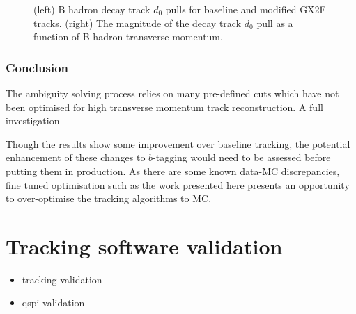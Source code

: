 \begin{figure}[!htbp]
\begin{subfigure}{.5\textwidth}
    \end{subfigure}
    \caption{(left) B hadron decay track $d_0$ pulls for baseline and modified GX2F tracks. (right) The magnitude of the decay track $d_0$ pull as a function of B hadron transverse momentum.}
    \label{fig:gx2f_opt_pulls}
\end{figure}




\subsubsection{Conclusion}

The ambiguity solving process relies on many pre-defined cuts which have not been optimised for high transverse momentum \bhadron track reconstruction.
A full investigation 


Though the results show some improvement over baseline tracking, the potential enhancement of these changes to $b$-tagging would need to be assessed before putting them in production. As there are some known data-MC discrepancies, fine tuned optimisation such as the work presented here presents an opportunity to over-optimise the tracking algorithms to MC.



\section{Tracking software validation}\label{sec:r22-validation}

\begin{itemize}
  \item tracking validation
  \item qspi validation
\end{itemize}